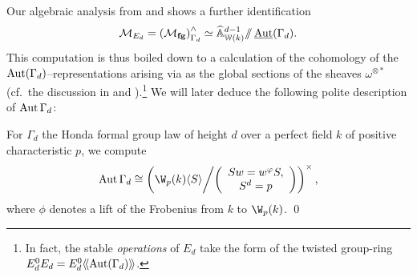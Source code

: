 \noindent Our algebraic analysis from  and  shows a further identification \[\mathcal{M}_{E_d} = \left( \mathcal{M}_{\mathbf{fg}} \right)^\wedge_{\Gamma_d} \simeq \widehat{\mathbb A}^{d-1}_{\mathbb W(k)} /\!\!/ \operatorname{\underline{\smash{\operatorname{Aut}}}}(\Gamma_d).\]  This computation is thus boiled down to a calculation of the cohomology of the \(\operatorname{Aut}(\Gamma_d)\)--representations arising via  as the global sections of the sheaves \(\omega^{\otimes *}\) (cf.\ the discussion in  and ).\footnote{In fact, the stable \emph{operations} of \(E_d\) take the form of the twisted group-ring \(E_d^0 E_d = E_d^0\langle\!\langle\operatorname{Aut}(\Gamma_d)\rangle\!\rangle\).}  We will later deduce the following polite description of \(\operatorname{Aut} \Gamma_d\):
\begin{theorem}\label{FormOfStabilizerGroupEarly}
For \(\Gamma_d\) the Honda formal group law of height \(d\) over a perfect field \(k\) of positive characteristic \(p\), we compute \[\Aut \Gamma_d \cong \left( \W_p(k) \<S\> \middle/ \left( \begin{array}{c} Sw = w^\phi S, \\ S^d = p \end{array} \right) \right)^\times,\] where \(\phi\) denotes a lift of the Frobenius from \(k\) to \(\W_p(k)\). \qed
\end{theorem}

